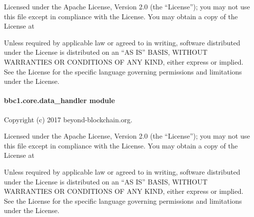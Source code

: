 \documentclass[letterpaper,10pt,english]{sphinxmanual}
\begin{document}
Licensed under the Apache License, Version 2.0 (the “License”);
you may not use this file except in compliance with the License.
You may obtain a copy of the License at
\begin{quote}

\end{quote}

Unless required by applicable law or agreed to in writing, software
distributed under the License is distributed on an “AS IS” BASIS,
WITHOUT WARRANTIES OR CONDITIONS OF ANY KIND, either express or implied.
See the License for the specific language governing permissions and
limitations under the License.

\begin{fulllineitems}
\label{\detokenize{bbc1.core.command:bbc1.core.command.parser}}
\end{fulllineitems}



\paragraph{bbc1.core.data\_handler module}
\label{\detokenize{bbc1.core.data_handler::doc}}\label{\detokenize{bbc1.core.data_handler:bbc1-core-data-handler-module}}\label{\detokenize{bbc1.core.data_handler:module-bbc1.core.data_handler}}
Copyright (c) 2017 beyond-blockchain.org.

Licensed under the Apache License, Version 2.0 (the “License”);
you may not use this file except in compliance with the License.
You may obtain a copy of the License at
\begin{quote}

\end{quote}

Unless required by applicable law or agreed to in writing, software
distributed under the License is distributed on an “AS IS” BASIS,
WITHOUT WARRANTIES OR CONDITIONS OF ANY KIND, either express or implied.
See the License for the specific language governing permissions and
limitations under the License.
\end{document}
